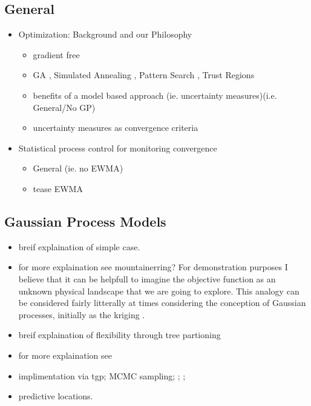 \documentclass[12pt]{article}
\begin{document}
	\subsection{General}
	\begin{itemize}
	\item Optimization: Background and our Philosophy
		\begin{itemize}
		\item[\checkmark] gradient free \cite{noGradBook}
		\item[\checkmark] GA \cite{noGradBook}, Simulated Annealing \cite{noGradBook}, Pattern Search \cite{noGradBook}, Trust Regions \cite{noGradBook} 
		\item[\checkmark] benefits of a model based approach (ie. {\color{red} uncertainty} measures)(i.e. General/No GP)
		\item[\checkmark] {\color{red} uncertainty} measures as convergence criteria
		\end{itemize}
	\item Statistical process control for monitoring convergence
		\begin{itemize}
		\item General \cite{shewhartBook} (ie. no EWMA)
		\item tease EWMA
		\end{itemize}
	\end{itemize}
	\subsection{Gaussian Process Models}
	\begin{itemize}
	
	\item breif explaination of simple case.
	\item for more explaination see \cite{gpJasa}
	{\color{red} mountainerring?
	For demonstration purposes I believe that it can be helpfull to imagine the objective function as an unknown physical landscape that we are going to explore.
	This analogy can be considered fairly litterally at times considering the conception of Gaussian processes, initially as the kriging \cite{}. }
	\item breif explaination of flexibility through tree partioning
	\item for more explaination see \cite{gpJasa}
	\item implimentation via tgp; MCMC sampling; \cite{tgp}; \cite{tgp2};
	\item predictive locations.
	\end{itemize}
	
\end{document}
